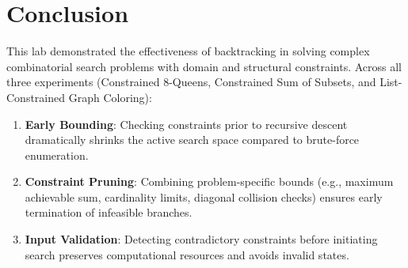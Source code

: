 \documentclass[12pt]{article}
\begin{document}
\section{Conclusion}
This lab demonstrated the effectiveness of backtracking in solving complex combinatorial search problems with domain and structural constraints. Across all three experiments (Constrained 8-Queens, Constrained Sum of Subsets, and List-Constrained Graph Coloring):
\begin{enumerate}
    \item \textbf{Early Bounding}: Checking constraints prior to recursive descent dramatically shrinks the active search space compared to brute-force enumeration.
    \item \textbf{Constraint Pruning}: Combining problem-specific bounds (e.g., maximum achievable sum, cardinality limits, diagonal collision checks) ensures early termination of infeasible branches.
    \item \textbf{Input Validation}: Detecting contradictory constraints before initiating search preserves computational resources and avoids invalid states.
\end{enumerate}
\end{document}

